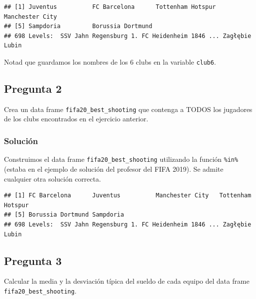 \documentclass[]{article}
\newenvironment{Shaded}{\begin{snugshade}}{\end{snugshade}}
\newcommand{\KeywordTok}[1]{\textcolor[rgb]{0.13,0.29,0.53}{\textbf{#1}}}
\newcommand{\NormalTok}[1]{#1}
\newcommand{\OperatorTok}[1]{\textcolor[rgb]{0.81,0.36,0.00}{\textbf{#1}}}
\newcommand{\StringTok}[1]{\textcolor[rgb]{0.31,0.60,0.02}{#1}}
\begin{document}
\begin{verbatim}
## [1] Juventus          FC Barcelona      Tottenham Hotspur Manchester City  
## [5] Sampdoria         Borussia Dortmund
## 698 Levels:  SSV Jahn Regensburg 1. FC Heidenheim 1846 ... Zagłębie Lubin
\end{verbatim}

Notad que guardamos los nombres de los 6 clubs en la variable
\texttt{club6}.

\hypertarget{pregunta-2}{%
\subsection{Pregunta 2}\label{pregunta-2}}

Crea un data frame \texttt{fifa20\_best\_shooting} que contenga a TODOS
los jugadores de los clubs encontrados en el ejercicio anterior.

\hypertarget{soluciuxf3n-1}{%
\subsubsection{Solución}\label{soluciuxf3n-1}}

Construimos el data frame \texttt{fifa20\_best\_shooting} utilizando la
función \texttt{\%in\%} (estaba en el ejemplo de solución del profesor
del FIFA 2019). Se admite cualquier otra solución correcta.

\begin{Shaded}
\end{Shaded}

\begin{verbatim}
## [1] FC Barcelona      Juventus          Manchester City   Tottenham Hotspur
## [5] Borussia Dortmund Sampdoria        
## 698 Levels:  SSV Jahn Regensburg 1. FC Heidenheim 1846 ... Zagłębie Lubin
\end{verbatim}

\hypertarget{pregunta-3}{%
\subsection{Pregunta 3}\label{pregunta-3}}

Calcular la media y la desviación típica del sueldo de cada equipo del
data frame \texttt{fifa20\_best\_shooting}.
\end{document}
